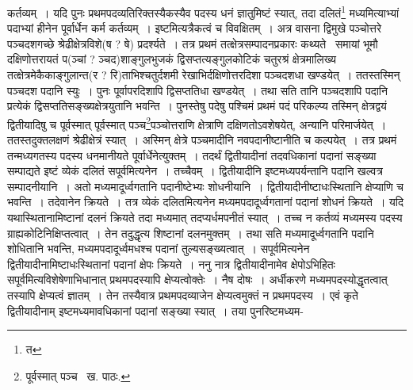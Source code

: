 \documentclass[11pt, openany]{book}
\begin{document}
\noindent कर्तव्यम्~। यदि पुनः प्रथमपदव्यतिरिक्तस्यैकस्यैव पदस्य धनं ज्ञातुमिष्टं स्यात्, तदा दलितं\renewcommand{\thefootnote}{१}\footnote{त} मध्यमित्याभ्यां पदाभ्यां हीनेन पूर्वार्धेन कर्म कर्तव्यम्~। इष्टमित्यत्रैकत्वं च विवक्षितम्~। अत्र वासना द्विमुखे पञ्चोत्तरे पञ्चदशगच्छे श्रेढीक्षेत्रविशे(ष ? षे) प्रदर्श्यते~। तत्र प्रथमं
तत्क्षेत्रसम्पादनप्रकारः कथ्यते \textendash\ समायां भूमौ दक्षिणोत्तरायतं प(ञ्चां ? ञ्चद)शाङ्गुलभुजकं द्विसप्तत्यङ्गुलकोटिकं चतुरश्रं क्षेत्रमालिख्य तत्क्षेत्रमेकैकाङ्गुलान्त(र ? रि)ताभिश्चतुर्दशमी रेखाभिर्दक्षिणोत्तरदिशा पञ्चदशधा खण्डयेत्~। ततस्तस्मिन् पञ्चदश पदानि स्युः~। पुनः पूर्वापरदिशापि द्विसप्ततिधा खण्डयेत्~। तथा सति तानि पञ्चदशापि पदानि प्रत्येकं द्विसप्ततिसङ्ख्यक्षेत्रयुतानि भवन्ति~। पुनस्तेषु पदेषु पश्चिमं प्रथमं पदं परिकल्प्य तस्मिन् क्षेत्रद्वयं द्वितीयादिषु च पूर्वस्मात् पूर्वस्मात् पञ्च\renewcommand{\thefootnote}{२}\footnote{पूर्वस्मात् पञ्च \textendash\ ख. पाठः.}पञ्चोत्तराणि क्षेत्राणि दक्षिणतोऽवशेषयेत्, अन्यानि परिमार्जयेत्~। ततस्तदुक्तलक्षणं श्रेढीक्षेत्रं स्यात्~। अस्मिन् क्षेत्रे पञ्चमादीनि नवपदानीष्टानीति च कल्पयेत्~। तत्र प्रथमं तन्मध्यगतस्य पदस्य धनमानीयते पूर्वार्धेनेत्युक्तम्~। तदर्थं द्वितीयादीनां तदवधिकानां पदानां सङ्ख्या सम्पाद्यते {\qt इष्टं व्येकं दलितं सपूर्वमि}त्यनेन~। तच्चैवम्~। द्वितीयादीनि
इष्टमध्यपर्यन्तानि पदानि खल्वत्र सम्पादनीयानि~। अतो मध्यमादूर्ध्वगतानि पदानीष्टेभ्यः शोधनीयानि~। द्वितीयादीनीष्टाधःस्थितानि क्षेप्याणि च भवन्ति~। तदेवानेन क्रियते~। तत्र व्येकं दलितमित्यनेन मध्यमपदादूर्ध्वगतानां पदानां शोधनं क्रियते~। यदि यथास्थितानामिष्टानां दलनं क्रियते तदा मध्यमात् तदप्यर्धमपनीतं स्यात्~। तच्च न कर्तव्यं मध्यमस्य पदस्य ग्राह्यकोटिनिक्षिप्तत्वात्~। तेन तदुद्धृत्य शिष्टानां दलनमुक्तम्~। तथा सति मध्यमादूर्ध्वगतानि पदानि शोधितानि भवन्ति, मध्यमपदादूर्ध्वमधश्च पदानां तुल्यसङ्ख्यत्वात्~। सपूर्वमित्यनेन द्वितीयादीनामिष्टाधःस्थितानां पदानां क्षेपः क्रियते~। ननु नात्र द्वितीयादीनामेव क्षेपोऽभिहितः सपूर्वमित्यविशेषेणाभिधानात् प्रथमपदस्यापि क्षेप्यत्वोक्तेः~। नैष दोषः~। अर्धीकरणे मध्यमपदस्योद्धृतत्वात् तस्यापि क्षेप्यत्वं ज्ञातम्~। तेन तस्यैवात्र प्रथमपदव्याजेन क्षेप्यत्वमुक्तं न प्रथमपदस्य~। एवं कृते द्वितीयादीनाम् इष्टमध्यमावधिकानां पदानां सङ्ख्या स्यात्~। तया पुनरिष्टमध्यम-

\newpage
\end{document}
